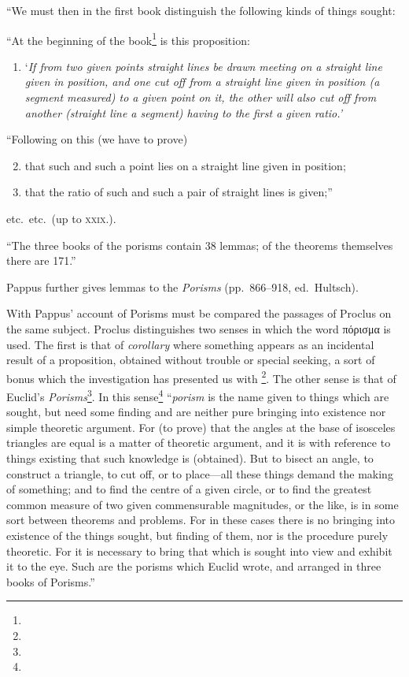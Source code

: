 ``We must then in the first book distinguish the following kinds of things sought:

``At the beginning of the book\footnote{} is this proposition:

\begin{enumerate}[label=\Roman*.]
	\item `\emph{If from two given points straight lines be drawn meeting on a straight line given in position, and one cut off from a straight line given in position (a segment measured) to a given point on it, the other will also cut off from another (straight line a segment) having to the first a given ratio.'}
\end{enumerate}

``Following on this (we have to prove)
\begin{enumerate}[label=\Roman*.]
	\setcounter{enumi}{1}
	\item that such and such a point lies on a straight line given in position;
	\item that the ratio of such and such a pair of straight lines is given;''
\end{enumerate}
etc.\ etc.\ (up to \textsc{xxix}.).

``The three books of the porisms contain 38 lemmas; of the theorems themselves there are 171.''

Pappus further gives lemmas to the \emph{Porisms} (pp.~866--918, ed.~Hultsch).

With Pappus' account of Porisms must be compared the passages of Proclus on the same subject. Proclus distinguishes two senses in which the word πόρισμα is used. The first is that of \emph{corollary} where something appears as an incidental result of a proposition, obtained without trouble or special seeking, a sort of bonus which the investigation has presented us with \footnote{}. The other sense is that of Euclid's \emph{Porisms}\footnote{}. In this sense\footnote{} ``\emph{porism} is the name given to things which are sought, but need some finding and are neither pure bringing into existence nor simple theoretic argument. For (to prove) that the angles at the base of isosceles triangles are equal is a matter of theoretic argument, and it is with reference to things existing that such knowledge is (obtained). But to bisect an angle, to construct a triangle, to cut off, or to place---all these things demand the making of something; and to find the centre of a given circle, or to find the greatest common measure of two given commensurable magnitudes, or the like, is in some sort between theorems and problems. For in these cases there is no bringing into existence of the things sought, but finding of them, nor is the procedure purely theoretic. For it is necessary to bring that which is sought into view and exhibit it to the eye. Such are the porisms which Euclid wrote, and arranged in three books of Porisms.''

